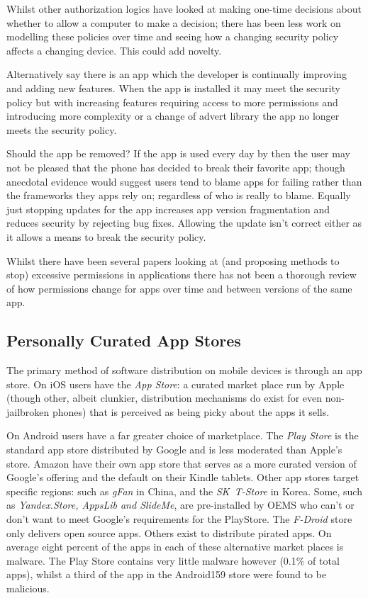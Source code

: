 \documentclass[a4paper,12pt,sfsidenotes]{tufte-book}
\begin{document}
Whilst other authorization logics have looked at making one-time decisions about
whether to allow a computer to make a decision; there has been less work on
modelling these policies over time and seeing how a changing security policy
affects a changing device.  This could add novelty.

Alternatively say there is an app which the developer is continually improving
and adding new features.  When the app is installed it may meet the security
policy but with increasing features requiring access to more permissions and
introducing more complexity or a change of advert library the app no longer
meets the security policy.

Should the app be removed?  If the app is used every day by then the user may
not be pleased that the phone has decided to break their favorite
app; though anecdotal evidence would suggest users tend to blame apps
  for failing rather than the frameworks they apps rely on; regardless of who is
  really to blame. Equally just stopping updates for the app increases app
version fragmentation and reduces security by rejecting bug fixes.  Allowing the
update isn't correct either as it allows a means to break the security policy.

Whilst there have been several papers looking at (and proposing methods to stop)
excessive permissions in applications\cite{Felt:2011kj}\cite{Vidas:2011wr} there
has not been a thorough review of how permissions change for apps over time
and between versions of the same app. 



\subsection{Personally Curated App Stores}

The primary method of software distribution on mobile devices is through an app
store.  On iOS users have the \emph{App Store}: a curated market place run by
Apple (though other, albeit clunkier, distribution mechanisms do exist for even
non-jailbroken phones) that is perceived as being picky about the apps it sells.

On Android users have a far greater choice of marketplace.  The \emph{Play
  Store} is the standard app store distributed by Google and is less moderated
than Apple's store.  Amazon have their own app store that serves as a more
curated version of Google's offering and the default on their Kindle tablets.
Other app stores target specific regions: such as \emph{gFan} in China, and the
\emph{SK~T-Store} in Korea.  Some, such as \emph{Yandex.Store, AppsLib and
  SlideMe}, are pre-installed by OEMS who can't or don't want to meet Google's
requirements for the PlayStore.  The \emph{F-Droid} store only delivers open
source apps. Others exist to distribute pirated apps.  On average eight
percent\cite{AQUILINO:2013wr} of the apps in each of these alternative market
places is malware. The Play Store contains very little malware however (0.1\% of
total apps), whilst a third of the app in the Android159 store were found to be
malicious.
\end{document}
